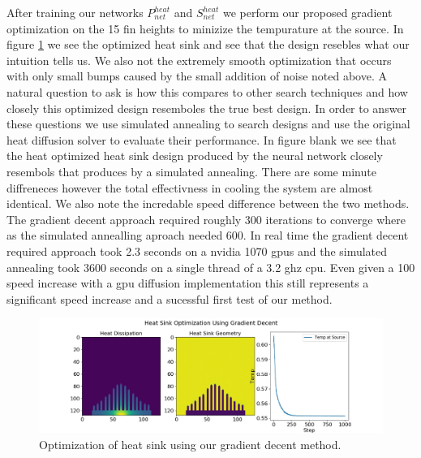\documentclass{article} %
\begin{document}
After training our networks $P^{heat}_{net}$ and $S^{heat}_{net}$ we perform our proposed gradient optimization on the 15 fin heights to minizize the tempurature at the source. In figure \ref{heat_sink_optimization} we see the optimized heat sink and see that the design resebles what our intuition tells us. We also not the extremely smooth optimization that occurs with only small bumps caused by the small addition of noise noted above. A natural question to ask is how this compares to other search techniques and how closely this optimized design resemboles the true best design. In order to answer these questions we use simulated annealing to search designs and use the original heat diffusion solver to evaluate their performance. In figure blank we see that the heat optimized heat sink design produced by the neural network closely resembols that produces by a simulated annealing. There are some minute diffreneces however the total effectivness in cooling the system are almost identical. We also note the incredable speed difference between the two methods. The gradient decent approach required roughly 300 iterations to converge where as the simulated annealling aproach needed 600. In real time the gradient decent required approach took 2.3 seconds on a nvidia 1070 gpus and the simulated annealing took 3600 seconds on a single thread of a 3.2 ghz cpu. Even given a 100 speed increase with a gpu diffusion implementation this still represents a significant speed increase and a sucessful first test of our method.

\begin{figure}[!t]
\begin{center}
\includegraphics[scale=0.30]{../test/figs/heat_learn_gradient_decent.jpeg}
\end{center}
\caption{Optimization of heat sink using our gradient decent method.}
\label{heat_sink_optimization}
\end{figure}
\end{document}
